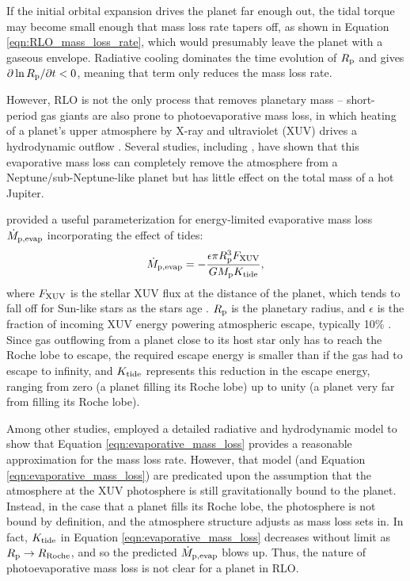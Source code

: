 \documentclass{svjour3}                     %
\begin{document}
If the initial orbital expansion drives the planet far enough out, the tidal torque may become small enough that mass loss rate tapers off, as shown in Equation \ref{eqn:RLO_mass_loss_rate}, which would presumably leave the planet with a gaseous envelope. Radiative cooling dominates the time evolution of $R_{\rm p}$ and gives $\partial \ln R_{\rm p}/\partial t < 0$, meaning that term only reduces the mass loss rate.

However, RLO is not the only process that removes planetary mass -- short-period gas giants are also prone to photoevaporative mass loss, in which heating of a planet's upper atmosphere by X-ray and ultraviolet (XUV) drives a hydrodynamic outflow  \cite{VidalMadjar2003Extended,2014ApJ...783...54K}. Several studies, including \cite{Lopez2013Role}, have shown that this evaporative mass loss can completely remove the atmosphere from a Neptune/sub-Neptune-like planet but has little effect on the total mass of a hot Jupiter. 

\cite{Erkaev2007Roche} provided a useful parameterization for energy-limited evaporative mass loss $\dot{M}_{\rm p, evap}$ incorporating the effect of tides:
\begin{equation}
\dot{M}_{\rm p, evap} = -\frac{\epsilon \pi R_{\rm p}^3 F_{\rm XUV}}{G M_{\rm p} K_{\rm tide}},
\label{eqn:evaporative_mass_loss}
\end{equation}
where $F_{\rm XUV}$ is the stellar XUV flux at the distance of the planet, which tends to fall off for Sun-like stars as the stars age \cite{Ribas2005Evolution}. $R_{\rm p}$ is the planetary radius, and $\epsilon$ is the fraction of incoming XUV energy powering atmospheric escape, typically 10\% \cite{Owen2012Planetary}. Since gas outflowing from a planet close to its host star only has to reach the Roche lobe to escape, the required escape energy is smaller than if the gas had to escape to infinity, and $K_{\rm tide}$ represents this reduction in the escape energy, ranging from zero (a planet filling its Roche lobe) up to unity (a planet very far from filling its Roche lobe). 

Among other studies, \cite{2009ApJ...693...23M} employed a detailed radiative and hydrodynamic model to show that Equation \ref{eqn:evaporative_mass_loss} provides a reasonable approximation for the mass loss rate. However, that model (and Equation \ref{eqn:evaporative_mass_loss}) are predicated upon the assumption that the atmosphere at the XUV photosphere is still gravitationally bound to the planet. Instead, in the case that a planet fills its Roche lobe, the photosphere is not bound by definition, and the atmosphere structure adjusts as mass loss sets in. In fact, $K_{\rm tide}$ in Equation \ref{eqn:evaporative_mass_loss} decreases without limit as $R_{\rm p} \rightarrow R_{\rm Roche}$, and so the predicted $\dot{M}_{\rm p, evap}$ blows up. Thus, the nature of photoevaporative mass loss is not clear for a planet in RLO. 
\end{document}
